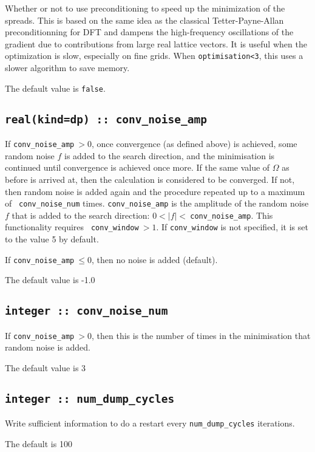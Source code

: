 Whether or not to use preconditioning to speed up the minimization of
the spreads. This is based on the same idea as the classical
Tetter-Payne-Allan preconditionning for DFT and dampens the
high-frequency oscillations of the gradient due to contributions from
large real lattice vectors. It is useful when the optimization is
slow, especially on fine grids. When \verb#optimisation<3#, this uses
a slower algorithm to save memory.

The default value is \verb#false#.

\subsection[conv\_noise\_amp]{\tt real(kind=dp) :: conv\_noise\_amp}

If {\tt conv\_noise\_amp}$\:>0$, once convergence (as defined above) is
achieved, some random noise $f$ is added to the search direction, and the
minimisation is continued until convergence is achieved once more. If
the same value of $\Omega$ as before is arrived at, then the calculation
is considered to be converged. If not, then random noise is added
again and the procedure repeated up to a maximum of {\tt
  conv\_noise\_num} times. {\tt conv\_noise\_amp} is the amplitude of
the random noise $f$ that is added to the search direction:
$0 < |f| <\:${\tt conv\_noise\_amp}. This functionality requires {\tt
  conv\_window}$\:>1$. If {\tt conv\_window} is not specified, it is set
to the value 5 by default.

If {\tt conv\_noise\_amp}$\:\leq 0$, then no noise is added (default).

The default value is -1.0

\subsection[conv\_noise\_num]{\tt integer :: conv\_noise\_num}

If {\tt conv\_noise\_amp}$\:>0$, then this is the number of times in the
minimisation that random noise is added.

The default value is 3

\subsection[num\_dump\_cycles]{\tt integer :: num\_dump\_cycles}
Write sufficient information to do a restart every
\verb#num_dump_cycles# iterations.

The default is 100

